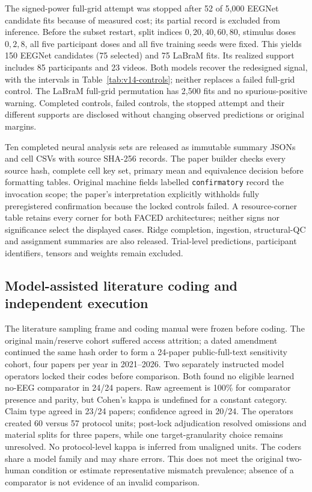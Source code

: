The signed-power full-grid attempt was stopped after 52 of 5,000 EEGNet
candidate fits because of measured cost; its partial record is excluded from
inference. Before the subset restart, split indices $0,20,40,60,80$, stimulus
doses $0,2,8$, all five participant doses and all five training seeds were
fixed. This yields 150 EEGNet candidates (75 selected) and 75 LaBraM fits. Its
realized support includes 85 participants and 23 videos. Both models recover
the redesigned signal, with the intervals in Table~\ref{tab:v14-controls};
neither replaces a failed full-grid control. The LaBraM full-grid permutation
has 2,500 fits and no spurious-positive warning. Completed controls, failed
controls, the stopped attempt and their different supports are disclosed
without changing observed predictions or original margins.

Ten completed neural analysis sets are released as immutable summary JSONs and
cell CSVs with source SHA-256 records. The paper builder checks every source
hash, complete cell key set, primary mean and equivalence decision before
formatting tables. Original machine fields labelled \texttt{confirmatory}
record the invocation scope; the paper's interpretation explicitly withholds
fully preregistered confirmation because the locked controls failed. A
resource-corner table retains every corner for both FACED architectures;
neither signs nor significance select the displayed cases. Ridge completion,
ingestion, structural-QC and assignment summaries are also released. Trial-level
predictions, participant identifiers, tensors and weights remain excluded.

\subsection{Model-assisted literature coding and independent execution}
The literature sampling frame and coding manual were frozen before coding.
The original main/reserve cohort suffered access attrition; a dated amendment
continued the same hash order to form a 24-paper public-full-text sensitivity
cohort, four papers per year in 2021--2026. Two separately instructed model
operators locked their codes before comparison. Both found no eligible learned
no-EEG comparator in 24/24 papers. Raw agreement is 100\% for comparator
presence and parity, but Cohen's kappa is undefined for a constant category.
Claim type agreed in 23/24 papers; confidence agreed in 20/24. The operators
created 60 versus 57 protocol units; post-lock adjudication resolved omissions
and material splits for three papers, while one target-granularity choice
remains unresolved. No protocol-level kappa is inferred from unaligned units.
The coders share a model family and may share errors. This does not meet the
original two-human condition or estimate representative mismatch prevalence;
absence of a comparator is not evidence of an invalid comparison.

